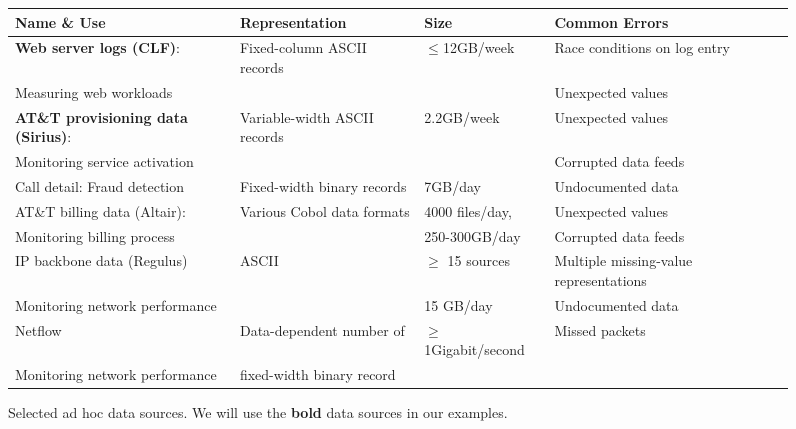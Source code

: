 \documentclass{sig-alternate}
\newcommand{\dibbler}{Sirius}
\newcommand{\ningaui}{Altair}
\newcommand{\darkstar}{Regulus}
\begin{document}
\begin{figure*}
\begin{center}
\begin{tabular}{|l|l|l|l|l|}
\hline
Name \& Use   &  Representation              &Size           & Common Errors \\ \hline\hline
\textbf{Web server logs (CLF)}: &  Fixed-column ASCII records & $\leq$12GB/week & Race conditions on log entry\\ 
Measuring web workloads                   &                             &                             & Unexpected values\\ \hline
\textbf{AT\&T provisioning data (\dibbler{})}: & Variable-width ASCII records & 2.2GB/week & Unexpected values \\ 
Monitoring service activation &                              &            & Corrupted data feeds \\ \hline
Call detail: Fraud detection  &  Fixed-width binary records  &\appr{}7GB/day &  Undocumented data\\  \hline 
AT\&T billing data (\ningaui{}): & Various Cobol data formats  & \appr{}4000 files/day, & Unexpected values\\ 
Monitoring billing process   &                             & 250-300GB/day    & Corrupted data feeds \\ \hline
IP backbone data (\darkstar{})  & ASCII  & $\ge$ 15 sources  & Multiple missing-value representations \\
Monitoring network performance  &        & \appr{}15 GB/day              & Undocumented data \\ \hline
Netflow       & Data-dependent number of     & $\ge$1Gigabit/second  & Missed packets\\ 
Monitoring network performance              &  fixed-width binary record   &                       & \\ \hline

\end{tabular}
\caption{Selected ad hoc data sources.  We will use the \textbf{bold} data sources in our examples. }
\label{figure:data-sources}
\end{center}
\end{figure*}
\end{document}
